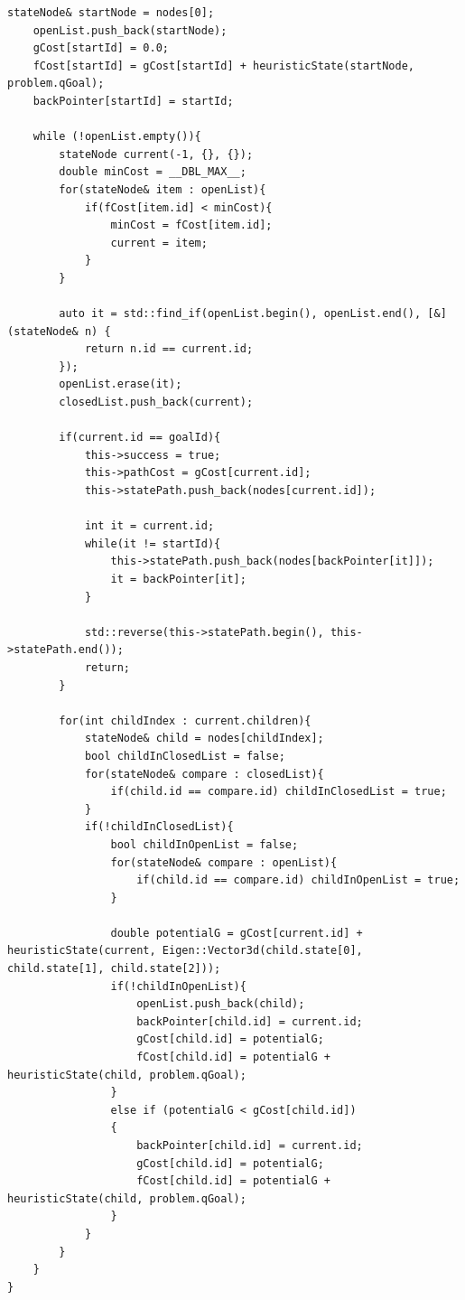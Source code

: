 \documentclass{article}
\begin{document}
\begin{lstlisting}[style=cppstyle]
    stateNode& startNode = nodes[0];
    openList.push_back(startNode);
    gCost[startId] = 0.0;
    fCost[startId] = gCost[startId] + heuristicState(startNode, problem.qGoal);
    backPointer[startId] = startId;

    while (!openList.empty()){
        stateNode current(-1, {}, {});
        double minCost = __DBL_MAX__;
        for(stateNode& item : openList){
            if(fCost[item.id] < minCost){
                minCost = fCost[item.id];
                current = item;
            }
        }
        
        auto it = std::find_if(openList.begin(), openList.end(), [&](stateNode& n) {
            return n.id == current.id;
        });
        openList.erase(it);
        closedList.push_back(current);
        
        if(current.id == goalId){
            this->success = true;
            this->pathCost = gCost[current.id];
            this->statePath.push_back(nodes[current.id]);

            int it = current.id;
            while(it != startId){
                this->statePath.push_back(nodes[backPointer[it]]);
                it = backPointer[it];
            }

            std::reverse(this->statePath.begin(), this->statePath.end());
            return;
        }

        for(int childIndex : current.children){
            stateNode& child = nodes[childIndex];
            bool childInClosedList = false;
            for(stateNode& compare : closedList){
                if(child.id == compare.id) childInClosedList = true;
            }
            if(!childInClosedList){
                bool childInOpenList = false;
                for(stateNode& compare : openList){
                    if(child.id == compare.id) childInOpenList = true;
                }

                double potentialG = gCost[current.id] + heuristicState(current, Eigen::Vector3d(child.state[0], child.state[1], child.state[2]));
                if(!childInOpenList){
                    openList.push_back(child);
                    backPointer[child.id] = current.id;
                    gCost[child.id] = potentialG;
                    fCost[child.id] = potentialG + heuristicState(child, problem.qGoal); 
                } 
                else if (potentialG < gCost[child.id])
                {
                    backPointer[child.id] = current.id;
                    gCost[child.id] = potentialG;
                    fCost[child.id] = potentialG + heuristicState(child, problem.qGoal);  
                }
            }
        }
    }
}
\end{lstlisting}
\end{document}
